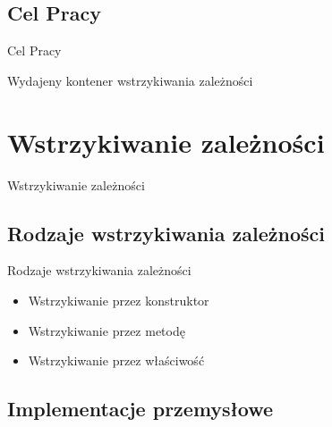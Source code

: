 \documentclass{beamer}
\begin{document}
\subsection*{Cel Pracy}

\begin{frame}{Cel Pracy}
\begin{center}
Wydajeny kontener wstrzykiwania zależności
\end{center}
\end{frame}


\section{Wstrzykiwanie zależności}

\begin{frame}{}
\begin{center}
\huge{Wstrzykiwanie zależności}
\end{center}
\end{frame}

\subsection*{Rodzaje wstrzykiwania zależności}

\begin{frame}{Rodzaje wstrzykiwania zależności}
\begin{itemize}
	\item Wstrzykiwanie przez konstruktor
	\item Wstrzykiwanie przez metodę
	\item Wstrzykiwanie przez właściwość
\end{itemize}
\end{frame}


\subsection*{Implementacje przemysłowe}
\end{document}
